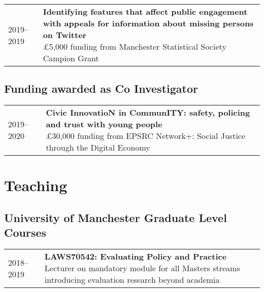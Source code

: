 \documentclass[10pt,a4paper,]{article}
\makeatletter
\def\briefitem#1#2#3{
#2 & \parbox[t]{0.85\textwidth}{%
      \textbf{#1}\\[-0.1cm]{\footnotesize #3}}\\[0.4cm]}
\def\briefsection#1{\begin{longtable}{@{\extracolsep{\fill}}ll}#1\end{longtable}}
\makeatother
\begin{document}
\briefsection{\briefitem{Identifying features that affect public engagement with appeals for information about missing persons on Twitter}{2019–2019}{£5,000 funding from Manchester Statistical Society Campion Grant}\briefitem{Using Bayesian Surprise maps to explore debt and insolvency across the UK}{2018–2019}{£10,000 funding from Consumer Data Research Centre, Economic and Social Research Council}\briefitem{Measuring fear of crime using app-based and sensing methodologies}{2017–2020}{£10,000 funding from British Academy and Leverhulme Small Grants}\briefitem{Building Tools and Training for Crime Analysts using R}{2017–2017}{£3,000 funding from N8 Policing Research Partnership}\briefitem{Data Visualisation in Criminal Courts}{2017–2017}{£1,000 funding from Economic Social Research Council, Festival of Social Sciences}}

\hypertarget{funding-awarded-as-co-investigator}{%
\subsection{Funding awarded as Co Investigator}\label{funding-awarded-as-co-investigator}}

\briefsection{\briefitem{Civic InnovatioN in CommunITY: safety, policing and trust with young people}{2019–2020}{£30,000 funding from EPSRC Network+: Social Justice through the Digital Economy}}

\hypertarget{teaching}{%
\section{Teaching}\label{teaching}}

\hypertarget{university-of-manchester-graduate-level-courses}{%
\subsection{University of Manchester Graduate Level Courses}\label{university-of-manchester-graduate-level-courses}}

\briefsection{\briefitem{LAWS70542: Evaluating Policy and Practice}{2018–2019}{Lecturer on mandatory module for all Masters streams introducing evaluation research beyond academia}\briefitem{LAWS70311: Designing Criminological Research}{2016–present}{Course director and primary lecturer on compulsory research methods module for all Masters streams}\briefitem{LAWS70821: Data Analysis with R \& R Studio}{2016–2019}{2016: Course director and sole lecturer, 2018 onwards: ad-hoc lecturer on introductory statistics for MRes students using R}}
\end{document}
